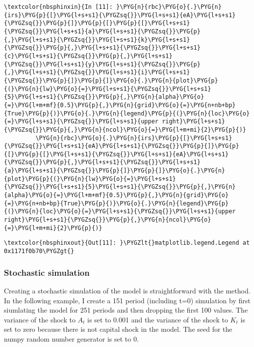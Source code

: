 \documentclass[letterpaper,10pt,openany,oneside,english]{sphinxmanual}
\begin{document}
\begin{Verbatim}[commandchars=\\\{\}]
\textcolor{nbsphinxin}{In [11]: }\PYG{n}{rbc}\PYG{o}{.}\PYG{n}{irs}\PYG{p}{[}\PYG{l+s+s1}{\PYGZsq{}}\PYG{l+s+s1}{eA}\PYG{l+s+s1}{\PYGZsq{}}\PYG{p}{]}\PYG{p}{[}\PYG{p}{[}\PYG{l+s+s1}{\PYGZsq{}}\PYG{l+s+s1}{a}\PYG{l+s+s1}{\PYGZsq{}}\PYG{p}{,}\PYG{l+s+s1}{\PYGZsq{}}\PYG{l+s+s1}{k}\PYG{l+s+s1}{\PYGZsq{}}\PYG{p}{,}\PYG{l+s+s1}{\PYGZsq{}}\PYG{l+s+s1}{c}\PYG{l+s+s1}{\PYGZsq{}}\PYG{p}{,}\PYG{l+s+s1}{\PYGZsq{}}\PYG{l+s+s1}{y}\PYG{l+s+s1}{\PYGZsq{}}\PYG{p}{,}\PYG{l+s+s1}{\PYGZsq{}}\PYG{l+s+s1}{i}\PYG{l+s+s1}{\PYGZsq{}}\PYG{p}{]}\PYG{p}{]}\PYG{o}{.}\PYG{n}{plot}\PYG{p}{(}\PYG{n}{lw}\PYG{o}{=}\PYG{l+s+s1}{\PYGZsq{}}\PYG{l+s+s1}{5}\PYG{l+s+s1}{\PYGZsq{}}\PYG{p}{,}\PYG{n}{alpha}\PYG{o}{=}\PYG{l+m+mf}{0.5}\PYG{p}{,}\PYG{n}{grid}\PYG{o}{=}\PYG{n+nb+bp}{True}\PYG{p}{)}\PYG{o}{.}\PYG{n}{legend}\PYG{p}{(}\PYG{n}{loc}\PYG{o}{=}\PYG{l+s+s1}{\PYGZsq{}}\PYG{l+s+s1}{upper right}\PYG{l+s+s1}{\PYGZsq{}}\PYG{p}{,}\PYG{n}{ncol}\PYG{o}{=}\PYG{l+m+mi}{2}\PYG{p}{)}
         \PYG{n}{rbc}\PYG{o}{.}\PYG{n}{irs}\PYG{p}{[}\PYG{l+s+s1}{\PYGZsq{}}\PYG{l+s+s1}{eA}\PYG{l+s+s1}{\PYGZsq{}}\PYG{p}{]}\PYG{p}{[}\PYG{p}{[}\PYG{l+s+s1}{\PYGZsq{}}\PYG{l+s+s1}{eA}\PYG{l+s+s1}{\PYGZsq{}}\PYG{p}{,}\PYG{l+s+s1}{\PYGZsq{}}\PYG{l+s+s1}{a}\PYG{l+s+s1}{\PYGZsq{}}\PYG{p}{]}\PYG{p}{]}\PYG{o}{.}\PYG{n}{plot}\PYG{p}{(}\PYG{n}{lw}\PYG{o}{=}\PYG{l+s+s1}{\PYGZsq{}}\PYG{l+s+s1}{5}\PYG{l+s+s1}{\PYGZsq{}}\PYG{p}{,}\PYG{n}{alpha}\PYG{o}{=}\PYG{l+m+mf}{0.5}\PYG{p}{,}\PYG{n}{grid}\PYG{o}{=}\PYG{n+nb+bp}{True}\PYG{p}{)}\PYG{o}{.}\PYG{n}{legend}\PYG{p}{(}\PYG{n}{loc}\PYG{o}{=}\PYG{l+s+s1}{\PYGZsq{}}\PYG{l+s+s1}{upper right}\PYG{l+s+s1}{\PYGZsq{}}\PYG{p}{,}\PYG{n}{ncol}\PYG{o}{=}\PYG{l+m+mi}{2}\PYG{p}{)}
\end{Verbatim}

\begin{Verbatim}[commandchars=\\\{\}]
\textcolor{nbsphinxout}{Out[11]: }\PYGZlt{}matplotlib.legend.Legend at 0x1171f0b70\PYGZgt{}
\end{Verbatim}

\noindent{}

\noindent{}


\subsubsection{Stochastic simulation}
\label{\detokenize{examples:Stochastic-simulation}}
Creating a stochastic simulation of the model is straightforward with
the  method. In the following example, I create a 151
period (including t=0) simulation by first siumlating the model for 251
periods and then dropping the first 100 values. The variance of the
shock to \(A_t\) is set to 0.001 and the variance of the shock to
\(K_t\) is set to zero because there is not capital shock in the
model. The seed for the numpy random number generator is set to 0.
\end{document}
